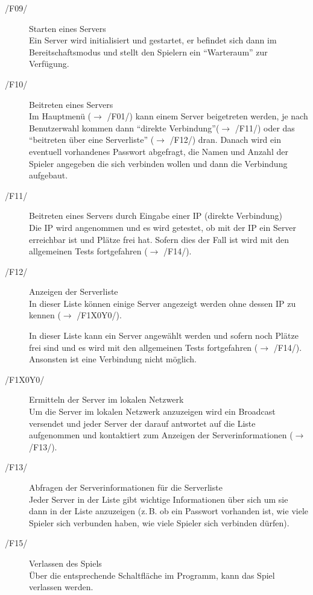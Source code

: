 \documentclass[a4paper,10pt]{article}
\begin{document}
\begin{description}
\item[/F09/] Starten eines Servers \\
Ein Server wird initialisiert und gestartet, er befindet sich dann im Bereitschaftsmodus und stellt den Spielern ein ``Warteraum'' zur Verfügung.

\item[/F10/] Beitreten eines Servers \\
Im Hauptmenü ($\rightarrow$ /F01/) kann einem Server beigetreten werden, je nach Benutzerwahl kommen dann ``direkte Verbindung''($\rightarrow$ /F11/) oder das ``beitreten über eine Serverliste'' ($\rightarrow$ /F12/) dran. Danach wird ein eventuell vorhandenes Passwort abgefragt, die Namen und Anzahl der Spieler angegeben die sich verbinden wollen und dann die Verbindung aufgebaut.

\item[/F11/] Beitreten eines Servers durch Eingabe einer IP (direkte Verbindung) \\
Die IP wird angenommen und es wird getestet, ob mit der IP ein Server erreichbar ist und Plätze frei hat. Sofern dies der Fall ist wird mit den allgemeinen Tests fortgefahren ($\rightarrow$ /F14/).

\item[/F12/] Anzeigen der Serverliste \\
In dieser Liste können einige Server angezeigt werden ohne dessen IP zu kennen ($\rightarrow$ /F1X0Y0/).

In dieser Liste kann ein Server angewählt werden und sofern noch Plätze frei sind und es wird mit den allgemeinen Tests fortgefahren ($\rightarrow$ /F14/). Ansonsten ist eine Verbindung nicht möglich.
\item[/F1X0Y0/] Ermitteln der Server im lokalen Netzwerk \\
Um die Server im lokalen Netzwerk anzuzeigen wird ein Broadcast versendet und jeder Server der darauf antwortet auf die Liste aufgenommen und kontaktiert zum Anzeigen der Serverinformationen ($\rightarrow$ /F13/).
\item[/F13/] Abfragen der Serverinformationen für die Serverliste \\
Jeder Server in der Liste gibt wichtige Informationen über sich um sie dann in der Liste anzuzeigen (z.\,B. ob ein Passwort vorhanden ist, wie viele Spieler sich verbunden haben, wie viele Spieler sich verbinden dürfen).
\item[/F15/] Verlassen des Spiels \\
Über die entsprechende Schaltfläche im Programm, kann das Spiel verlassen werden.
\end{description}
\end{document}
